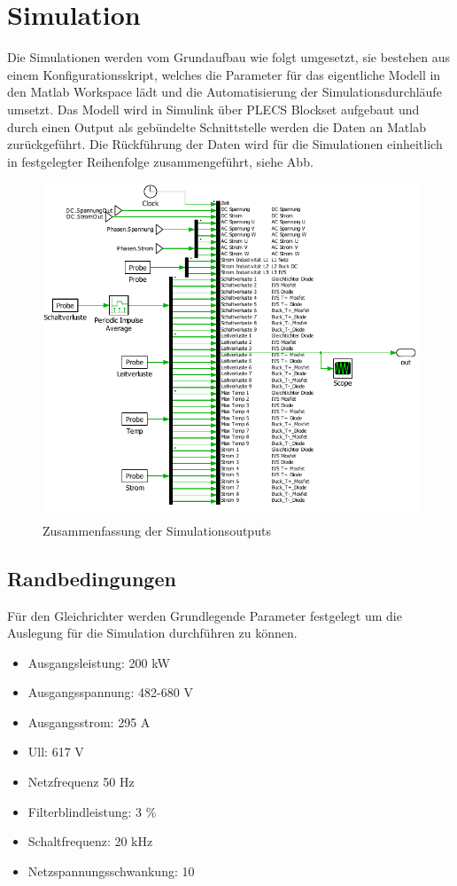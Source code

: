 \chapter{Simulation}
Die Simulationen werden vom Grundaufbau wie folgt umgesetzt, sie bestehen aus einem Konfigurationsskript, welches die Parameter für das eigentliche Modell in den Matlab Workspace lädt und die Automatisierung der Simulationsdurchläufe umsetzt. Das Modell wird in Simulink über PLECS Blockset aufgebaut und durch einen Output als gebündelte Schnittstelle werden die Daten an Matlab zurückgeführt. Die Rückführung der Daten wird für die Simulationen einheitlich in festgelegter Reihenfolge zusammengeführt, siehe Abb. 

\begin{figure}
	\centering
	\includegraphics[width=0.7\linewidth]{content/Grafiken/Plecs_Out}
	\caption[Zusammenfassung der Simulationsoutputs]{Zusammenfassung der Simulationsoutputs}
	\label{fig:plecsout}
\end{figure}

\section{Randbedingungen}
Für den Gleichrichter werden Grundlegende Parameter festgelegt um die Auslegung für die Simulation durchführen zu können. 

\begin{itemize}
	\item Ausgangsleistung: 200 kW
	\item Ausgangsspannung: 482-680 V
	\item Ausgangsstrom: 	295 A
	\item \gls{Ull}:		617 V
	\item Netzfrequenz		50 Hz
	\item Filterblindleistung: 3 \%
	\item Schaltfrequenz: 20 kHz
	\item Netzspannungsschwankung: 10%
\end{itemize}

